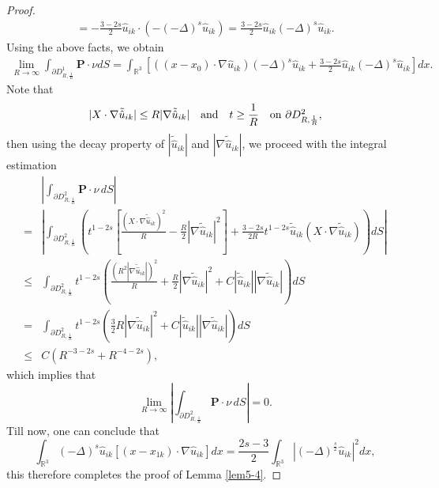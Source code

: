 \documentclass[reqno, 11pt]{amsart} %
\numberwithin{equation}{section}
\begin{document}
\begin{proof}
\begin{align*}
			= - \frac{3-2s}{2} \hat{u}_{ik} \cdot \left( - (-\Delta)^s \hat{u}_{ik} \right)  
			=  \frac{3-2s}{2} \hat{u}_{ik} (-\Delta)^s\hat{u}_{ik}.
		\end{align*}  
		Using the above facts, we obtain
		\begin{align*}
			\lim_{R \to \infty} \int_{\partial D_{R, \frac{1}{R}}^1} \mathbf{P} \cdot \nu dS= \int_{\mathbb{R}^3} \left[\left((x-x_0) \cdot \nabla \hat{u}_{ik}\right) (-\Delta)^s \hat{u}_{ik} + \frac{3-2s}{2} \hat{u}_{ik}  (-\Delta)^s \hat{u}_{ik} \right] dx.
		\end{align*}  
		Note that
		\begin{equation*}
			|X \cdot \nabla \tilde{\hat{u}}_{ik}| \le R|\nabla \tilde{\hat{u}}_{ik}|\quad   \hbox{and}\quad t\geq\frac{1}{R}\quad \hbox{on $\partial D_{R, \frac{1}{R}}^{2}$},
		\end{equation*}	
		then using the decay property of $| \tilde{\hat{u}}_{ik}|$
		and $|\nabla  \tilde{\hat{u}}_{ik}|$, we proceed with the integral estimation
		\begin{align*}
			&	\left| \int_{\partial D_{R, \frac{1}{R}}^2} \mathbf{P} \cdot \nu \, dS \right| \\
			= & \left| \int_{\partial D_{R, \frac{1}{R}}^2} \left( t^{1-2s} \left[ \frac{(X \cdot \nabla \tilde{\hat{u}}_{ik})^2}{R} - \frac{R}{2} |\nabla \tilde{\hat{u}}_{ik}|^2 \right] + \frac{3-2s}{2R} t^{1-2s} \tilde{\hat{u}}_{ik} (X \cdot \nabla \tilde{\hat{u}}_{ik}) \right) dS \right| \\
			\le& \int_{\partial D_{R, \frac{1}{R}}^2} t^{1-2s} \left( \frac{(R^{2} |\nabla \tilde{\hat{u}}_{ik}|)^2}{R} + \frac{R}{2} |\nabla \tilde{\hat{u}}_{ik}|^2 + C |\tilde{\hat{u}}_{ik}| |\nabla \tilde{\hat{u}}_{ik}| \right) dS \\
			=& \int_{\partial D_{R, \frac{1}{R}}^2} t^{1-2s} \left( \frac{3}{2} R |\nabla\tilde{\hat{u}}_{ik}|^2 + C |\tilde{\hat{u}}_{ik}| |\nabla \tilde{\hat{u}}_{ik}| \right) dS \\
			\le&  C \left( R^{-3-2s} + R^{-4-2s} \right),
		\end{align*}
		which implies that
		\begin{equation*}
			\lim_{R \to \infty} \left| \int_{\partial D_{R, \frac{1}{R}}^2} \mathbf{P} \cdot \nu \, dS \right| = 0.
		\end{equation*} 
		Till now, one can conclude that 
		\begin{equation*}
			\int_{\mathbb{R}^{3}}(-\Delta)^{s}\hat{u}_{ik}[(x-x_{1k})\cdot\nabla\hat{u}_{ik}]dx=\frac{2s-3}{2} \int_{\mathbb{R}^3} \left| (-\Delta)^{\frac{s}{2}}\hat{u}_{ik}\right| ^2dx,
		\end{equation*}
		this therefore completes the proof of Lemma \ref{lem5-4}.	
	\end{proof}
	
\end{document}
